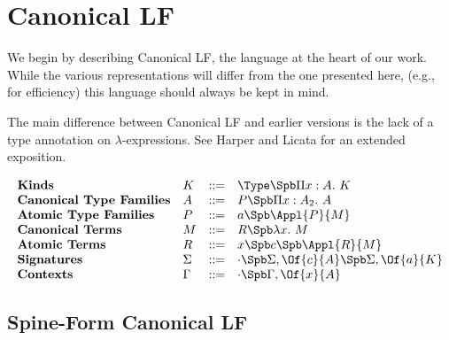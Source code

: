 

\section{Canonical LF}
We begin by describing Canonical LF, the language at the heart of our
work.  While the various representations will differ from the one presented here, 
(e.g., for efficiency) this language should always be kept in mind.

The main difference between Canonical LF and earlier versions
is the lack of a type annotation on $\lambda$-expressions.
See Harper and Licata\cite{HarperLicataCLF} for an extended
exposition.

\renewcommand{\PiTyp}[3]{\Pi #1 : #2.\ #3}
\renewcommand{\Lam}[2]{\lambda #1.\ #2}

$$
\begin{array}{llll}
\textbf{Kinds} & K & ::= & \Type \Spb \PiTyp{x}{A}{K} \\
\textbf{Canonical Type Families} & A & ::= & P \Spb \PiTyp{x}{A_2}{A} \\
\textbf{Atomic Type Families} & P & ::= & a \Spb \Appl{P}{M} \\
\textbf{Canonical Terms} & M & ::= & R \Spb \Lam{x}{M} \\
\textbf{Atomic Terms} & R & ::= &  x \Spb c \Spb \Appl{R}{M}\\
\textbf{Signatures} & \Sigma & ::= & \cdot \Spb \Sigma,\Of{c}{A} 
\Spb \Sigma,\Of{a}{K}\\
\textbf{Contexts} & \Gamma & ::= & \cdot \Spb \Gamma,\Of{x}{A}\\
\end{array}
$$


\subsection{Spine-Form Canonical LF}

